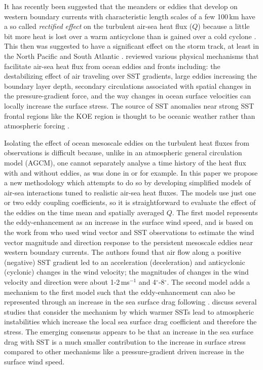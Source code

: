 It has recently been suggested that the meanders or eddies that develop on western boundary currents with characteristic length scales of a few 100\,km have a so called \textit{rectified effect} on the turbulent air-sea heat flux ($Q$) because a little bit more heat is lost over a warm anticyclone than is gained over a cold cyclone \citep{SMALL2008274,foussard2019storm}. This then was suggested to have a significant effect on the storm track, at least in the North Pacific \citep{ma2015improved,ma2017revised} and South Atlantic \citep{villas2015signature}. \citet{SMALL2008274} reviewed various physical mechanisms that facilitate air-sea heat flux from ocean eddies and fronts including: the destabilizing effect of air traveling over SST gradients, large eddies increasing the boundary layer depth, secondary circulations associated with spatial changes in the pressure-gradient force, and the way changes in ocean surface velocities can locally increase the surface stress. The source of SST anomalies near strong SST frontal regions like the KOE region is thought to be oceanic weather rather than atmospheric forcing \citep{bishop2017scale}.\par 

 

Isolating the effect of ocean mesoscale eddies on the turbulent heat fluxes from observations is difficult because, unlike in an atmospheric general circulation model (AGCM), one cannot separately analyse a time history of the heat flux with and without eddies, as was done in \citet{putrasahan2013isolating} or \citet{foussard2019storm} for example. In this paper we propose a new methodology which attempts to do so by developing simplified models of air-sea interactions tuned to realistic air-sea heat fluxes. The models use just one or two eddy coupling coefficients, so it is straightforward to evaluate the effect of the eddies on the time mean and spatially averaged $Q$. The first model represents the eddy-enhancement as an increase in the surface wind speed, and is based on the work from \citet{ONeill2010} who used wind vector and SST observations to estimate the wind vector magnitude and direction response to the persistent mesoscale eddies near western boundary currents. The authors found that air flow along a positive (negative) SST gradient led to an acceleration (deceleration) and anticyclonic (cyclonic) changes in the wind velocity; the magnitudes of changes in the wind velocity and direction were about 1-2\,ms$^{-1}$ and 4$^{\circ}$-8$^{\circ}$. The second model adds a mechanism to the first model such that the eddy-enhancement can also be represented through an increase in the sea surface drag following \citet{behringer1979thermal}. \citet{SMALL2008274} discuss several studies that consider the mechanism by which warmer SSTs lead to atmospheric instabilities which increase the local sea surface drag coefficient and therefore the stress. The emerging consensus appears to be that an increase in the sea surface drag with SST is a much smaller contribution to the increase in surface stress compared to other mechanisms like a pressure-gradient driven increase in the surface wind speed. 


